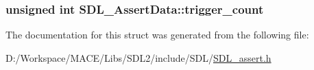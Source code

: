 \subsubsection[{\texorpdfstring{trigger\+\_\+count}{trigger_count}}]{\setlength{\rightskip}{0pt plus 5cm}unsigned {\bf int} S\+D\+L\+\_\+\+Assert\+Data\+::trigger\+\_\+count}\hypertarget{struct_s_d_l___assert_data_a230bbcc2d115aab04cf817773e08eb5b}{}\label{struct_s_d_l___assert_data_a230bbcc2d115aab04cf817773e08eb5b}


The documentation for this struct was generated from the following file\+:\begin{DoxyCompactItemize}
\item 
D\+:/\+Workspace/\+M\+A\+C\+E/\+Libs/\+S\+D\+L2/include/\+S\+D\+L/\hyperlink{_s_d_l__assert_8h}{S\+D\+L\+\_\+assert.\+h}\end{DoxyCompactItemize}

